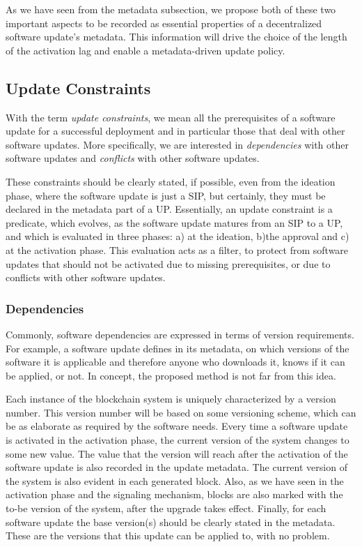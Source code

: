 As we have seen from the metadata subsection, we propose both of these two important aspects to be recorded as essential properties of a decentralized software update's metadata. This information will drive the choice of the length of the activation lag and enable a metadata-driven update policy.

\subsection{Update Constraints}
With the term \emph{update constraints}, we mean all the prerequisites of a software update for a successful deployment and in particular those that deal with other software updates. 
More specifically, we are interested in \emph{dependencies} with other software updates and \emph{conflicts} with other software updates. 

These constraints should be clearly stated, if possible, even from the ideation phase, where the software update is just a SIP, but certainly, they must be declared in the metadata part of a UP. Essentially, an update  constraint is a predicate, which evolves, as the software update matures from an SIP to a UP,  and which is evaluated in three phases: a) at the ideation, b)the approval and c) at the activation phase. This evaluation acts as a filter, to protect from software updates that should not be activated due to missing prerequisites, or due to conflicts with other software updates.

\subsubsection{Dependencies}
Commonly, software dependencies are expressed in terms of version requirements. For example, a software update defines in its metadata, on which versions of the software it is applicable and therefore anyone who downloads it, knows if it can be applied, or not. In concept, the proposed method is not far from this idea.

Each instance of the blockchain system is uniquely characterized by a version number. This version number will be based on some versioning scheme, which can be as elaborate as required by the software needs. Every time a software update is activated in the activation phase, the current version of the system changes to some new value. The value that the version will reach after the activation of the software update is also recorded in the update metadata. The current version of the system is also evident in each generated block. Also, as we have seen in the activation phase and the signaling mechanism, blocks are also marked with the to-be version of the system, after the upgrade takes effect. Finally, for each software update the base version(s) should be clearly stated in the metadata. These are the versions that this update can be applied to, with no problem. 

